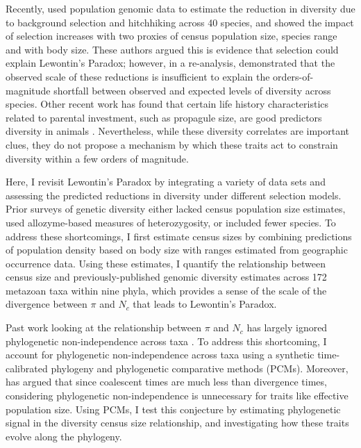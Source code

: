 \documentclass[11pt]{article}
\begin{document}
Recently, \textcite{Corbett-Detig2015-gt} used population genomic data to
estimate the reduction in diversity due to background selection and hitchhiking
across 40 species, and showed the impact of selection increases with two
proxies of census population size, species range and with body size. These
authors argued this is evidence that selection could explain Lewontin's
Paradox; however, in a re-analysis, \textcite{Coop2016-gx} demonstrated that
the observed scale of these reductions is insufficient to explain the
orders-of-magnitude shortfall between observed and expected levels of diversity
across species. Other recent work has found that certain life history
characteristics related to parental investment, such as propagule size, are
good predictors diversity in animals \parencite{Romiguier2014-bp,Chen2017-nf}.
Nevertheless, while these diversity correlates are important clues, they do not
propose a mechanism by which these traits act to constrain diversity within a
few orders of magnitude. 

Here, I revisit Lewontin's Paradox by integrating a variety of data sets and
assessing the predicted reductions in diversity under different selection
models. Prior surveys of genetic diversity either lacked census population size
estimates, used allozyme-based measures of heterozygosity, or included fewer
species. To address these shortcomings, I first estimate census sizes by
combining predictions of population density based on body size with ranges
estimated from geographic occurrence data. Using these estimates, I quantify
the relationship between census size and previously-published genomic diversity
estimates across 172 metazoan taxa within nine phyla, which provides a sense of
the scale of the divergence between $\pi$ and $N_c$ that leads to Lewontin's
Paradox. 

Past work looking at the relationship between $\pi$ and $N_c$ has largely
ignored phylogenetic non-independence across taxa
\parencite{Felsenstein1985-an}. To address this shortcoming, I account for
phylogenetic non-independence across taxa using a synthetic time-calibrated
phylogeny and phylogenetic comparative methods (PCMs). Moreover,
\textcite{Lynch2011-qv} has argued that since coalescent times are much less
than divergence times, considering phylogenetic non-independence is unnecessary
for traits like effective population size. Using PCMs, I test this conjecture
by estimating phylogenetic signal in the diversity census size relationship,
and investigating how these traits evolve along the phylogeny.
\end{document}
